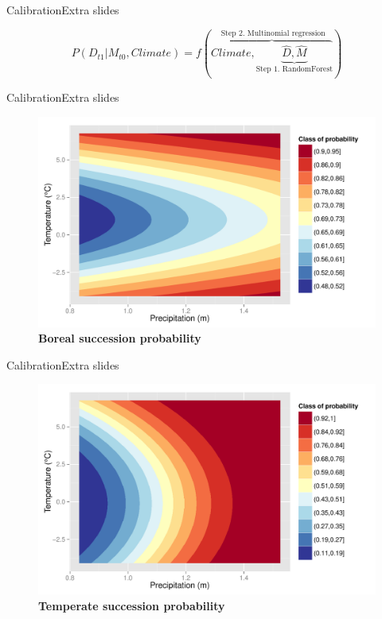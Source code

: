 \documentclass[10pt,aspectratio=149]{beamer}
\begin{document}

\begin{frame}{Calibration}{Extra slides}

	\begin{equation}
		P(D_{t1}|M_{t0}, Climate) = f(\overbrace{Climate, \underbrace{\hat{D}, \hat{M}}_\text{Step 1. RandomForest}}^\text{ Step 2. Multinomial regression})
	\label{eq1}
	\end{equation}

\end{frame}

\begin{frame}{Calibration}{Extra slides}

            \begin{figure}
              \caption*{\small \textbf{Boreal succession probability}}	
	          \includegraphics[width=0.8\linewidth]{Figs/alphab.pdf}
	        \end{figure}

\end{frame}

\begin{frame}{Calibration}{Extra slides}

            \begin{figure}
              \caption*{\small \textbf{Temperate succession probability}}	
	          \includegraphics[width=0.8\linewidth]{Figs/alphat.pdf}
	        \end{figure}

\end{frame}
\end{document}
